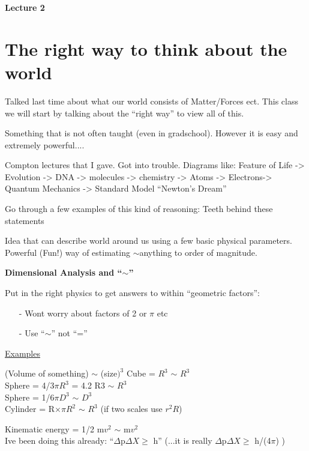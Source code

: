 
\usepackage{braket}

\def\ketY{\ensuremath{\ket {\Psi}}}
\def\iGeV{\ensuremath{\textrm{GeV}^{-1}}}
\def\mp{\ensuremath{m_{\textrm{proton}}}}
\def\me{\ensuremath{m_{\textrm{electron}}}}
\def\aG{\ensuremath{\alpha_G}}



\textbf{\Huge Lecture 2}

\section{The right way to think about the world}

Talked last time about what our world consists of Matter/Forces ect.
This class we will start by talking about the ``right way'' to view all of this. 

Something that is not often taught (even in gradschool).
However it is easy and extremely powerful....

Compton lectures that I gave. 
Got into trouble. 
Diagrams like: 
Feature of Life -> Evolution -> DNA -> molecules -> chemistry  -> Atoms ->  Electrons-> Quantum Mechanics -> Standard Model
``Newton's Dream''

Go through a few examples of this kind of reasoning:
Teeth behind these statements

Idea that can describe world around us using a few basic physical parameters.
Powerful (Fun!) way of estimating $\sim$anything to order of magnitude.

\textbf{Dimensional Analysis and ``$\sim$''}

Put in the right physics to get answers to within ``geometric factors'':
\begin{itemize}
\item[-] Wont worry about factors of 2 or $\pi$ etc
\item[-] Use ``$\sim$'' not ``=''
\end{itemize}

\underline{Examples}

(Volume of something) $\sim$ (size$)^3$
Cube = $R^{3}$ $\sim$ $R^3$\\
Sphere = 4/3$\pi R^3$ = 4.2 R3 $\sim$ $R^3$\\
Sphere = 1/6$\pi D^3$  $\sim$ $D^3$\\
Cylinder = R$\times\pi R^{2}$  $\sim$ $R^3$  (if two scales use $r^2R$) 

Kinematic energy = 1/2 m$v^2$ $\sim$ m$v^2$\\
Ive been doing this already: ``$\Delta$p$\Delta X \geq $ h''
(...it is really $\Delta$p$\Delta X \geq $ h/(4$\pi$) )

